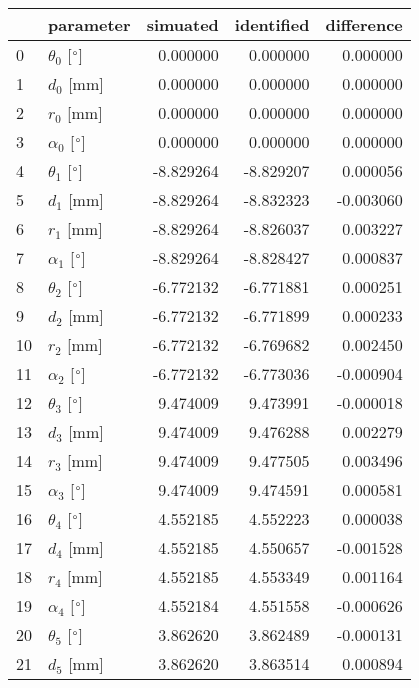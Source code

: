 \documentclass{standalone}%
\begin{document}
%
\normalsize%
\begin{tabular}{llrrr}
\toprule
{} &                 parameter &  simuated & identified & difference \\
\midrule
0  &  $\theta_{0}$ [$\degree$] &  0.000000 &   0.000000 &   0.000000 \\
1  &              $d_{0}$ [mm] &  0.000000 &   0.000000 &   0.000000 \\
2  &              $r_{0}$ [mm] &  0.000000 &   0.000000 &   0.000000 \\
3  &  $\alpha_{0}$ [$\degree$] &  0.000000 &   0.000000 &   0.000000 \\
4  &  $\theta_{1}$ [$\degree$] & -8.829264 &  -8.829207 &   0.000056 \\
5  &              $d_{1}$ [mm] & -8.829264 &  -8.832323 &  -0.003060 \\
6  &              $r_{1}$ [mm] & -8.829264 &  -8.826037 &   0.003227 \\
7  &  $\alpha_{1}$ [$\degree$] & -8.829264 &  -8.828427 &   0.000837 \\
8  &  $\theta_{2}$ [$\degree$] & -6.772132 &  -6.771881 &   0.000251 \\
9  &              $d_{2}$ [mm] & -6.772132 &  -6.771899 &   0.000233 \\
10 &              $r_{2}$ [mm] & -6.772132 &  -6.769682 &   0.002450 \\
11 &  $\alpha_{2}$ [$\degree$] & -6.772132 &  -6.773036 &  -0.000904 \\
12 &  $\theta_{3}$ [$\degree$] &  9.474009 &   9.473991 &  -0.000018 \\
13 &              $d_{3}$ [mm] &  9.474009 &   9.476288 &   0.002279 \\
14 &              $r_{3}$ [mm] &  9.474009 &   9.477505 &   0.003496 \\
15 &  $\alpha_{3}$ [$\degree$] &  9.474009 &   9.474591 &   0.000581 \\
16 &  $\theta_{4}$ [$\degree$] &  4.552185 &   4.552223 &   0.000038 \\
17 &              $d_{4}$ [mm] &  4.552185 &   4.550657 &  -0.001528 \\
18 &              $r_{4}$ [mm] &  4.552185 &   4.553349 &   0.001164 \\
19 &  $\alpha_{4}$ [$\degree$] &  4.552184 &   4.551558 &  -0.000626 \\
20 &  $\theta_{5}$ [$\degree$] &  3.862620 &   3.862489 &  -0.000131 \\
21 &              $d_{5}$ [mm] &  3.862620 &   3.863514 &   0.000894 \\

\end{tabular}
\end{document}
